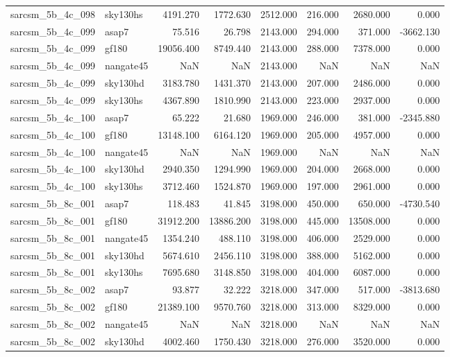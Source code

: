 \begin{tabular}{llrrrrrr}
sarcsm\_5b\_4c\_098 & sky130hs & 4191.270 & 1772.630 & 2512.000 & 216.000 & 2680.000 & 0.000 \\
sarcsm\_5b\_4c\_099 & asap7 & 75.516 & 26.798 & 2143.000 & 294.000 & 371.000 & -3662.130 \\
sarcsm\_5b\_4c\_099 & gf180 & 19056.400 & 8749.440 & 2143.000 & 288.000 & 7378.000 & 0.000 \\
sarcsm\_5b\_4c\_099 & nangate45 & NaN & NaN & 2143.000 & NaN & NaN & NaN \\
sarcsm\_5b\_4c\_099 & sky130hd & 3183.780 & 1431.370 & 2143.000 & 207.000 & 2486.000 & 0.000 \\
sarcsm\_5b\_4c\_099 & sky130hs & 4367.890 & 1810.990 & 2143.000 & 223.000 & 2937.000 & 0.000 \\
sarcsm\_5b\_4c\_100 & asap7 & 65.222 & 21.680 & 1969.000 & 246.000 & 381.000 & -2345.880 \\
sarcsm\_5b\_4c\_100 & gf180 & 13148.100 & 6164.120 & 1969.000 & 205.000 & 4957.000 & 0.000 \\
sarcsm\_5b\_4c\_100 & nangate45 & NaN & NaN & 1969.000 & NaN & NaN & NaN \\
sarcsm\_5b\_4c\_100 & sky130hd & 2940.350 & 1294.990 & 1969.000 & 204.000 & 2668.000 & 0.000 \\
sarcsm\_5b\_4c\_100 & sky130hs & 3712.460 & 1524.870 & 1969.000 & 197.000 & 2961.000 & 0.000 \\
sarcsm\_5b\_8c\_001 & asap7 & 118.483 & 41.845 & 3198.000 & 450.000 & 650.000 & -4730.540 \\
sarcsm\_5b\_8c\_001 & gf180 & 31912.200 & 13886.200 & 3198.000 & 445.000 & 13508.000 & 0.000 \\
sarcsm\_5b\_8c\_001 & nangate45 & 1354.240 & 488.110 & 3198.000 & 406.000 & 2529.000 & 0.000 \\
sarcsm\_5b\_8c\_001 & sky130hd & 5674.610 & 2456.110 & 3198.000 & 388.000 & 5162.000 & 0.000 \\
sarcsm\_5b\_8c\_001 & sky130hs & 7695.680 & 3148.850 & 3198.000 & 404.000 & 6087.000 & 0.000 \\
sarcsm\_5b\_8c\_002 & asap7 & 93.877 & 32.222 & 3218.000 & 347.000 & 517.000 & -3813.680 \\
sarcsm\_5b\_8c\_002 & gf180 & 21389.100 & 9570.760 & 3218.000 & 313.000 & 8329.000 & 0.000 \\
sarcsm\_5b\_8c\_002 & nangate45 & NaN & NaN & 3218.000 & NaN & NaN & NaN \\
sarcsm\_5b\_8c\_002 & sky130hd & 4002.460 & 1750.430 & 3218.000 & 276.000 & 3520.000 & 0.000 \\

\end{tabular}
